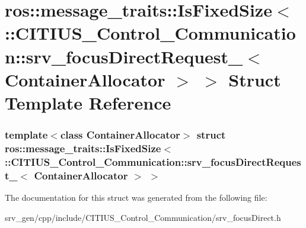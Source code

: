 \hypertarget{structros_1_1message__traits_1_1_is_fixed_size_3_01_1_1_c_i_t_i_u_s___control___communication_1_98047f5f9b53bb9e72380324e4e62b82}{\section{ros\-:\-:message\-\_\-traits\-:\-:\-Is\-Fixed\-Size$<$ \-:\-:\-C\-I\-T\-I\-U\-S\-\_\-\-Control\-\_\-\-Communication\-:\-:srv\-\_\-focus\-Direct\-Request\-\_\-$<$ \-Container\-Allocator $>$ $>$ \-Struct \-Template \-Reference}
\label{structros_1_1message__traits_1_1_is_fixed_size_3_01_1_1_c_i_t_i_u_s___control___communication_1_98047f5f9b53bb9e72380324e4e62b82}
}
\subsubsection*{template$<$class Container\-Allocator$>$ struct ros\-::message\-\_\-traits\-::\-Is\-Fixed\-Size$<$ \-::\-C\-I\-T\-I\-U\-S\-\_\-\-Control\-\_\-\-Communication\-::srv\-\_\-focus\-Direct\-Request\-\_\-$<$ Container\-Allocator $>$ $>$}



\-The documentation for this struct was generated from the following file\-:\begin{DoxyCompactItemize}
\item 
srv\-\_\-gen/cpp/include/\-C\-I\-T\-I\-U\-S\-\_\-\-Control\-\_\-\-Communication/srv\-\_\-focus\-Direct.\-h\end{DoxyCompactItemize}
